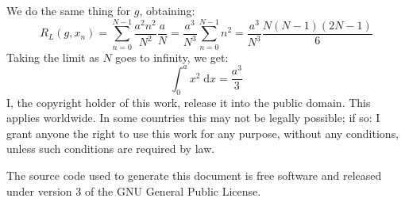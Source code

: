\documentclass{article}
\begin{document}
    We do the same thing for $g$, obtaining:
    \begin{equation}
        R_{L}(g,x_{n})=\sum_{n=0}^{N-1}\frac{a^{2}n^{2}}{N^{2}}\frac{a}{N}
            =\frac{a^{3}}{N^{3}}\sum_{n=0}^{N-1}n^{2}
            =\frac{a^{3}}{N^{3}}\frac{N(N-1)(2N-1)}{6}
    \end{equation}
    Taking the limit as $N$ goes to infinity, we get:
    \begin{equation}
        \int_{0}^{a}x^{2}\;\textrm{d}x=\frac{a^{3}}{3}
    \end{equation}
    \newpage
    I, the copyright holder of this work, release it into the public domain.
    This applies worldwide. In some countries this may not be legally possible;
    if so: I grant anyone the right to use this work for any purpose, without
    any conditions, unless such conditions are required by law.
    \par\hfill\par
    The source code used to generate this document is free software and released
    under version 3 of the GNU General Public License.
\end{document}
